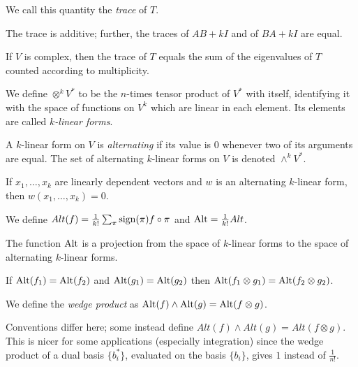 \begin{defn}
  We call this quantity the \emph{trace} of $T$.
\end{defn}
\begin{prop}
  The trace is additive; further, the traces of $AB+kI$ and of $BA+kI$ are equal.
\end{prop}
\begin{prop}
  If $V$ is complex, then the trace of $T$ equals the sum of the eigenvalues of
  $T$ counted according to multiplicity.
\end{prop}
\begin{defn}
    We define $\otimes^k V^*$ to be the $n$-times tensor product of $V^*$
    with itself, identifying it with the space of functions on $V^k$ which are
    linear in each element. Its elements are called \emph{$k$-linear forms}.
\end{defn}
\begin{defn}
    A $k$-linear form on $V$ is \emph{alternating} if its value is $0$ whenever
    two of its arguments are equal. The set of alternating $k$-linear forms on
    $V$ is denoted $\wedge^k V^*$.
\end{defn}
\begin{prop}
    If $x_1,\ldots,x_k$ are linearly dependent vectors and $w$ is an alternating
    $k$-linear form, then $w(x_1,\ldots,x_k)=0$.
\end{prop}
\begin{defn}
    We define $Alt(f)=\frac 1{k!}\sum_\pi\mathrm{sign}(\pi)f\circ\pi$ and $\mathrm{Alt}=\frac
    1{k!}Alt$.
\end{defn}
\begin{prop}
    The function $\mathrm{Alt}$ is a projection from the space of
    $k$-linear forms to the space of alternating $k$-linear forms.
\end{prop}
\begin{prop}
    If $\mathrm{Alt}(f_1)=\mathrm{Alt}(f_2)$ and $\mathrm{Alt}(g_1)=\mathrm{Alt}(g_2)$ then $\mathrm{Alt}(f_1\otimes
    g_1)=\mathrm{Alt}(f_2\otimes g_2)$.
\end{prop}
\begin{defn}
    We define
    the \emph{wedge product} as $\mathrm{Alt}(f)\wedge \mathrm{Alt}(g)=\mathrm{Alt}(f\otimes g)$.
\end{defn}
\begin{rem}
    Conventions differ here; some instead define $Alt(f)\wedge Alt(g)=Alt(f\otimes
    g)$. This is nicer for some applications (especially integration)
    since the wedge product of a dual
    basis $\{b_i^*\}$, evaluated on the basis $\{b_i\}$, gives $1$ instead of
    $\frac 1{n!}$.
\end{rem}
